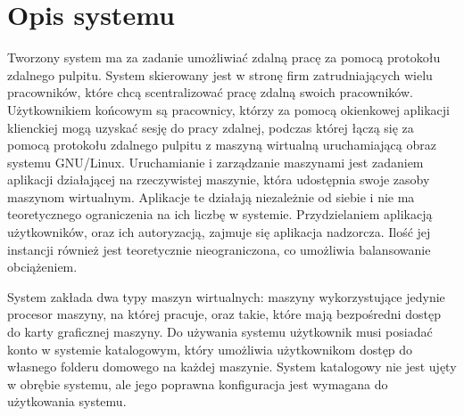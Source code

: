 \documentclass[12pt]{article}
\begin{document}

\abstract


\tableofcontents

\newpage


\section{Opis systemu}
Tworzony system ma za zadanie umożliwiać zdalną pracę za pomocą protokołu zdalnego pulpitu. System skierowany jest w stronę firm zatrudniających wielu pracowników, które chcą scentralizować pracę zdalną swoich pracowników. Użytkownikiem końcowym są pracownicy, którzy za pomocą okienkowej aplikacji klienckiej mogą uzyskać sesję do pracy zdalnej, podczas której łączą się za pomocą protokołu zdalnego pulpitu z maszyną wirtualną uruchamiającą obraz systemu GNU/Linux. Uruchamianie i zarządzanie maszynami jest zadaniem aplikacji działającej na rzeczywistej maszynie, która udostępnia swoje zasoby maszynom wirtualnym. Aplikacje te działają niezależnie od siebie i nie ma teoretycznego ograniczenia na ich liczbę w systemie. Przydzielaniem aplikacją użytkowników, oraz ich autoryzacją, zajmuje się aplikacja nadzorcza. Ilość jej instancji również jest teoretycznie nieograniczona, co umożliwia balansowanie obciążeniem.

System zakłada dwa typy maszyn wirtualnych: maszyny wykorzystujące jedynie procesor maszyny, na której pracuje, oraz takie, które mają bezpośredni dostęp do karty graficznej maszyny. Do używania systemu użytkownik musi posiadać konto w systemie katalogowym, który umożliwia użytkownikom dostęp do własnego folderu domowego na każdej maszynie. System katalogowy nie jest ujęty w obrębie systemu, ale jego poprawna konfiguracja jest wymagana do użytkowania systemu.
\end{document}
